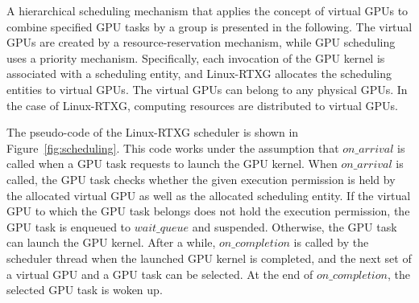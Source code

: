 A hierarchical scheduling mechanism that applies the concept of virtual GPUs to combine specified GPU tasks by a group is presented in the following.
The virtual GPUs are created by a resource-reservation mechanism, while GPU scheduling uses a priority mechanism.
Specifically, each invocation of the GPU kernel is associated with a scheduling entity, and Linux-RTXG allocates the scheduling entities to virtual GPUs.
The virtual GPUs can belong to any physical GPUs.
In the case of Linux-RTXG, computing resources are distributed to virtual GPUs.

The pseudo-code of the Linux-RTXG scheduler is shown in Figure~\ref{fig:scheduling}.
This code works under the assumption that $on\_arrival$ is called when a GPU task requests to launch the GPU kernel.
When $on\_arrival$ is called, the GPU task checks whether the given execution permission is held by the allocated virtual GPU as well as the allocated scheduling entity.
If the virtual GPU to which the GPU task belongs does not hold the execution permission, the GPU task is enqueued to $wait\_queue$ and suspended.
Otherwise, the GPU task can launch the GPU kernel.
After a while, $on\_completion$ is called by the scheduler thread when the launched GPU kernel is completed, and the next set of a virtual GPU and a GPU task can be selected.
At the end of $on\_completion$, the selected GPU task is woken up.


